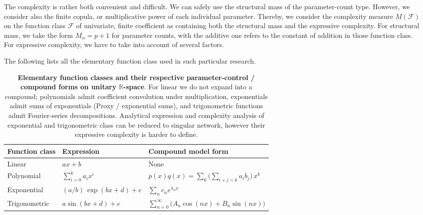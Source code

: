 \documentclass{article}
\begin{document}
The complexity is rather both convenient and difficult. We can safely use the structural mass of the parameter-count type. However, we consider also the finite copula, or multiplicative power of each individual parameter. Thereby, we consider the complexity measure $M(\mathcal{F})$ on the function class $\mathcal{F}$ of univariate, finite coefficient as containing both the structural mass and the expressive complexity. For structural mass, we take the form $M_{\alpha}= p+1$ for parameter counts, with the additive one refers to the constant of addition in those function class. For expressive complexity, we have to take into account of several factors. 

The following lists all the elementary function class used in such particular research. 

\begin{table}[htb]
  \centering
  \begin{tabularx}{\textwidth}{L{2cm} L{3cm} Y}
    \toprule
    Function class & Expression & Compound model form\\
    \midrule
    Linear & \(a x + b\) & None \\
    Polynomial & \(\displaystyle \sum_{i=0}^{k} a_{i} x^{i}\) &
        $p(x)q(x)=\sum_{k}\Big(\sum_{i+j=k} a_i b_j\Big)\,x^k$\\
    Exponential & \((a/b)\,\exp(bx+d)+e\) &
    \(\displaystyle \sum_{n} c_n e^{\lambda_n x}\)
    \\
    Trigonometric & \(a\sin(bx+d)+e\) &
    \(\displaystyle \sum_{n=0}^{\infty}\big(A_n\cos(nx)+B_n\sin(nx)\big)\)
    \\
    \bottomrule
  \end{tabularx}
  \caption{\textbf{Elementary function classes and their respective parameter-control / compound forms on unitary $\mathbb{R}$-space}. For linear we do not expand into a compound; polynomials admit coefficient convolution under multiplication,
    exponentials admit sums of exponentials (Proxy / exponential sums), and trigonometric functions admit Fourier-series decompositions. Analytical expression and complexity analysis of exponential and trigonometric class can be reduced to singular network, however their expressive complexity is harder to define. 
  }
\end{table}
\end{document}
